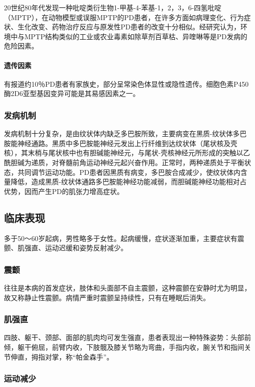 20世纪80年代发现一种吡啶类衍生物1-甲基-4-苯基-1，2，3，6-四氢吡啶（MPTP），在动物模型或误服MPTP的PD患者，在许多方面如病理变化、行为症状、生化改变、药物治疗反应与原发性PD患者的改变十分相似。经研究认为，环境中与MPTP结构类似的工业或农业毒素如除草剂百草枯、异喹啉等是PD发病的危险因素。
\paragraph{遗传因素}

有报道约10％PD患者有家族史，部分呈常染色体显性或隐性遗传。细胞色素P450酶2D6亚型基因变异可能是其易感因素之一。

\subsubsection{发病机制}

发病机制十分复杂，是由纹状体内缺乏多巴胺所致，主要病变在黑质-纹状体多巴胺能神经通路。黑质中多巴胺能神经元发出上行纤维到达纹状体（尾状核及壳核），其末梢与尾状核中也有胆碱能神经元，与尾状-壳核神经元所形成的突触以乙酰胆碱为递质，对脊髓前角运动神经元起兴奋作用。正常时，两种递质处于平衡状态，共同调节运动功能。PD患者因黑质有病变，多巴胺合成减少，使纹状体内含量降低，造成黑质-纹状体通路多巴胺能神经功能减弱，而胆碱能神经功能相对占优势，因而产生PD的肌张力增高症状。

\subsection{临床表现}

多于50～60岁起病，男性略多于女性。起病缓慢，症状逐渐加重，主要症状有震颤、肌强直、运动迟缓和姿势反射减少。

\subsubsection{震颤}

往往是本病的首发症状，肢体和头面部不自主震颤，这种震颤在安静时尤为明显，故又称静止性震颤。病情严重时震颤呈持续性，只有在睡眠后消失。

\subsubsection{肌强直}

四肢、躯干、颈部、面部的肌肉均可发生强直，患者表现出一种特殊姿势：头部前倾，躯干俯屈，前臂内收，下肢髋及膝关节略为弯曲，手指内收，腕关节和指间关节伸直，拇指对掌，称“帕金森手”。

\subsubsection{运动减少}


